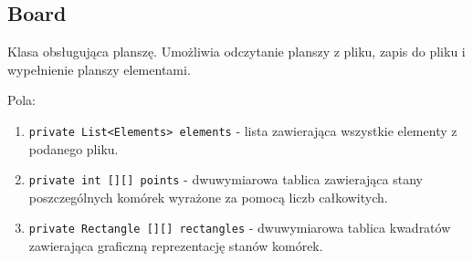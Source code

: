 \documentclass[a4paper,11pt, notitlepage ]{article}
\begin{document}
\subsection{Board}
Klasa obsługująca planszę. Umożliwia odczytanie planszy z pliku, zapis do pliku i wypełnienie planszy elementami.

Pola:
\begin{enumerate}
\item \verb+private List<Elements> elements+ - lista zawierająca wszystkie elementy z podanego pliku.
\item \verb+private int [][] points+ - dwuwymiarowa tablica zawierająca stany poszczególnych komórek wyrażone za pomocą liczb całkowitych.
\item \verb+private Rectangle [][] rectangles+ - dwuwymiarowa tablica kwadratów zawierająca graficzną reprezentację stanów komórek. 
\end{enumerate}
\end{document}
